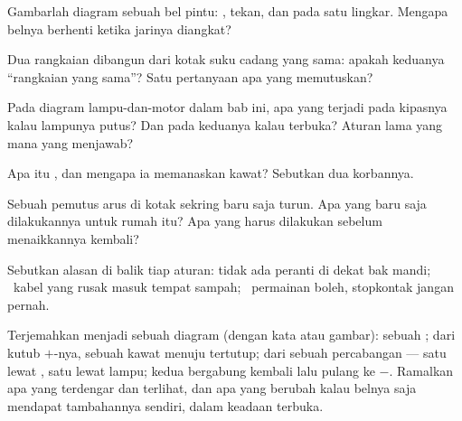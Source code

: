 \begin{exercise}[$\star$]\label{exo:g6:circuits-and-safety:3}
Gambarlah diagram sebuah bel pintu: ,  tekan, dan  pada satu lingkar. Mengapa belnya berhenti ketika jarinya
diangkat?
\end{exercise}

\begin{exercise}[$\star$]\label{exo:g6:circuits-and-safety:4}
Dua rangkaian dibangun dari kotak suku cadang yang sama: apakah
keduanya ``rangkaian yang sama''? Satu pertanyaan apa yang memutuskan?
\end{exercise}

\begin{exercise}[$\star$]\label{exo:g6:circuits-and-safety:5}
Pada diagram lampu-dan-motor dalam bab ini, apa yang terjadi pada
kipasnya kalau lampunya putus? Dan pada keduanya kalau 
terbuka? Aturan lama yang mana yang menjawab?
\end{exercise}

\begin{exercise}[$\star$]\label{exo:g6:circuits-and-safety:6}
Apa itu , dan mengapa ia memanaskan kawat? Sebutkan dua
korbannya.
\end{exercise}

\begin{exercise}[$\star$]\label{exo:g6:circuits-and-safety:7}
Sebuah pemutus arus di kotak sekring baru saja turun. Apa yang baru
saja dilakukannya untuk rumah itu? Apa yang harus dilakukan sebelum
menaikkannya kembali?
\end{exercise}

\begin{exercise}[$\star$]\label{exo:g6:circuits-and-safety:8}
Sebutkan alasan di balik tiap aturan: tidak ada peranti di dekat bak
mandi; \ kabel yang rusak masuk tempat sampah; \ permainan 
boleh, stopkontak jangan pernah.
\end{exercise}

\begin{exercise}[$\star\star$]\label{exo:g6:circuits-and-safety:9}
Terjemahkan menjadi sebuah diagram (dengan kata atau gambar): sebuah
; dari kutub $+$-nya, sebuah kawat menuju  tertutup;
dari  sebuah percabangan --- satu  lewat ,
satu lewat lampu; kedua  bergabung kembali lalu pulang ke
$-$. Ramalkan apa yang terdengar dan terlihat, dan apa yang berubah
kalau  belnya saja mendapat  tambahannya sendiri, dalam
keadaan terbuka.
\end{exercise}

